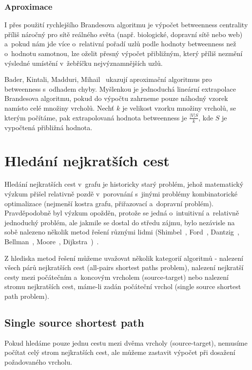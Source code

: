 \documentclass{bakalarka}
\begin{document}
\subsubsection{Aproximace}
I přes použití rychlejšího Brandesova algoritmu je výpočet betweenness
centrality příliš náročný pro sítě reálného světa (např. biologické, dopravní
sítě nebo web) a~pokud nám jde více o~relativní pořadí uzlů podle hodnoty
betweenness než o~hodnotu samotnou, lze oželit přesný výpočet přibližným, který
příliš nezmění výsledné umístění v~žebříčku nejvýznamnějších uzlů.

Bader, Kintali, Madduri, Mihail~\citep{bkmm2007} ukazují aproximační algoritmus
pro betweenness s~odhadem chyby.  Myšlenkou je jednoduchá lineární extrapolace
Brandesova algoritmu, pokud do výpočtu zahrneme pouze náhodný vzorek namísto
celé množiny vrcholů. Nechť $k$ je velikost vzorku množiny vrcholů, se kterým
počítáme, pak extrapolovaná hodnota betweenness je $\frac{|V| S}{k}$, kde $S$
je vypočtená přibližná hodnota.


\section{Hledání nejkratších cest}
Hledání nejkratších cest v~grafu je historicky starý problém, jehož matematický
výzkum přišel relativně pozdě v~porovnání s~jinými problémy kombinatorické
optimalizace (nejmenší kostra grafu, přiřazovací a~dopravní problém).
Pravděpodobně byl výzkum opožděn, protože se jedná o~intuitivní a~relativně
jednoduchý problém, ale jakmile se dostal do středu zájmu, bylo nezávisle na
sobě nalezeno několik metod řešení různými lidmi (Shimbel~\citep{shimbel1955},
Ford~\citep{ford1956}, Dantzig~\citep{dantzig1957},
Bellman~\citep{bellmanford_algorithm}, Moore~\citep{moore1959},
Dijkstra~\citep{dijkstra1959})~\citep{schrijver2012}.


Z hlediska metod řešení můžeme uvažovat několik kategorií algoritmů - nalezení
všech párů nejkratších cest (all-pairs shortest paths problem), nalezení
nejkratší cesty mezi počátečním a~koncovým vrcholem (source-target) nebo
nalezení stromu nejkratších cest, máme-li zadán počáteční vrchol (single source
shortest path problem).


\subsection{Single source shortest path}
Pokud hledáme pouze jednu cestu mezi dvěma vrcholy (source-target), nemusíme
počítat celý strom nejkratších cest, ale můžeme zastavit výpočet při dosažení
požadovaného vrcholu. 
\end{document}
